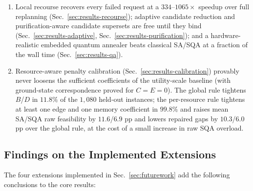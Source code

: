 \documentclass[10pt,a4paper]{article}
\begin{document}
\begin{enumerate}
    reliability: Metropolis and the hybrid pipeline deliver with zero
    SLA violations, while a sub-optimal SQA plan violates up to $8\%$
    of deliveries---a direct price of its $46\%$ mean optimality gap,
    certified against exact ILP (Sec.~\ref{sec:results-recourse}).
  \item Local recourse recovers every failed request at a
    $334$--$1065\times$ speedup over full replanning
    (Sec.~\ref{sec:results-recourse}); adaptive candidate reduction and
    purification-aware candidate supersets are free until they bind
    (Sec.~\ref{sec:results-adaptive}, Sec.~\ref{sec:results-purification});
    and a hardware-realistic embedded quantum annealer beats classical
    SA/SQA at a fraction of the wall time
    (Sec.~\ref{sec:results-qa}).
  \item Resource-aware penalty calibration
    (Sec.~\ref{sec:results-calibration}) provably never loosens the
    sufficient coefficients of the utility-scale baseline (with
    ground-state correspondence proved for $C=E=0$).  The global rule
    tightens $B$/$D$ in $11.8\%$ of the $1{,}080$ held-out instances;
    the per-resource rule tightens at least one edge and one memory
    coefficient in $99.8\%$ and raises mean SA/SQA raw feasibility by
    $11.6$/$6.9$ pp and lowers repaired gaps by $10.3$/$6.0$ pp over the
    global rule, at the cost of a small increase in raw SQA overload.
\end{enumerate}

\subsection{Findings on the Implemented Extensions}

The four extensions implemented in Sec.~\ref{sec:futurework} add the
following conclusions to the core results:
\end{document}
